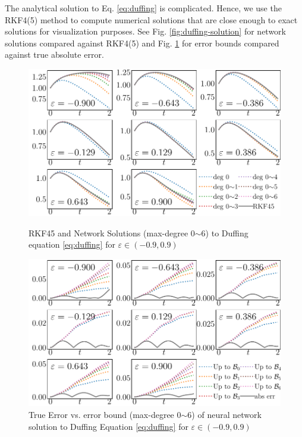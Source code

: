 \documentclass[accepted]{uai2023}
\begin{document}
    The analytical solution to Eq. \ref{eq:duffing} is complicated. Hence, we use the RKF4(5) method to compute numerical solutions that are close enough to exact solutions for visualization purposes. See Fig. \ref{fig:duffing-solution} for network solutions compared against RKF4(5) and Fig. \ref{fig:duffing-error} for error bounds compared against true absolute error.
    \begin{figure}[!htp]
        \centering
        \includegraphics[width=\linewidth]{assets/duffing-solution.pdf}
        \caption{\small RKF45 and Network Solutions (max-degree 0$\sim$6) to Duffing equation \ref{eq:duffing} for $\varepsilon \in (-0.9, 0.9)$}\label{fig:duffing-solution}
        \vspace{1em}
        \includegraphics[width=\linewidth]{assets/duffing-error.pdf}
        \caption{\small True Error vs. error bound (max-degree 0$\sim$6) of neural network solution to Duffing Equation \ref{eq:duffing} for $\varepsilon \in (-0.9, 0.9)$}\label{fig:duffing-error}
    \end{figure}
\end{document}
